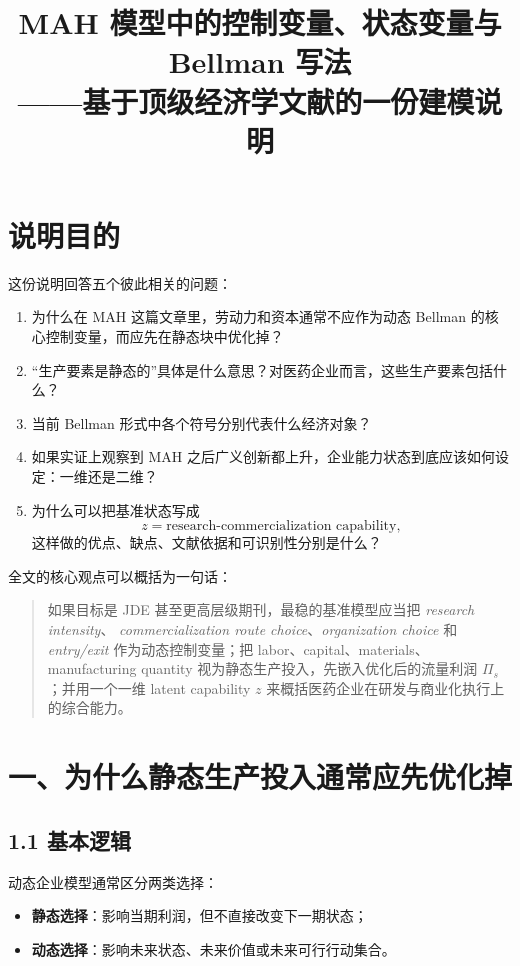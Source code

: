 \documentclass[12pt]{ctexart}
\title{MAH 模型中的控制变量、状态变量与 Bellman 写法\\
——基于顶级经济学文献的一份建模说明}
\author{}
\date{}
\begin{document}
\maketitle

\section{说明目的}

这份说明回答五个彼此相关的问题：

\begin{enumerate}[leftmargin=2em]
    \item 为什么在 MAH 这篇文章里，劳动力和资本通常不应作为动态 Bellman 的核心控制变量，而应先在静态块中优化掉？
    \item “生产要素是静态的”具体是什么意思？对医药企业而言，这些生产要素包括什么？
    \item 当前 Bellman 形式中各个符号分别代表什么经济对象？
    \item 如果实证上观察到 MAH 之后广义创新都上升，企业能力状态到底应该如何设定：一维还是二维？
    \item 为什么可以把基准状态写成
    \[
    z=\text{research-commercialization capability},
    \]
    这样做的优点、缺点、文献依据和可识别性分别是什么？
\end{enumerate}

全文的核心观点可以概括为一句话：

\begin{quote}
如果目标是 JDE 甚至更高层级期刊，最稳的基准模型应当把 \emph{research intensity}、
\emph{commercialization route choice}、\emph{organization choice} 和
\emph{entry/exit} 作为动态控制变量；把 labor、capital、materials、
manufacturing quantity 视为静态生产投入，先嵌入优化后的流量利润
\(\Pi_s\)；并用一个一维 latent capability \(z\) 来概括医药企业在研发与商业化执行上的综合能力。
\end{quote}

\section{一、为什么静态生产投入通常应先优化掉}

\subsection{1.1 基本逻辑}

动态企业模型通常区分两类选择：

\begin{itemize}[leftmargin=2em]
    \item \textbf{静态选择}：影响当期利润，但不直接改变下一期状态；
    \item \textbf{动态选择}：影响未来状态、未来价值或未来可行行动集合。
\end{itemize}
\end{document}
